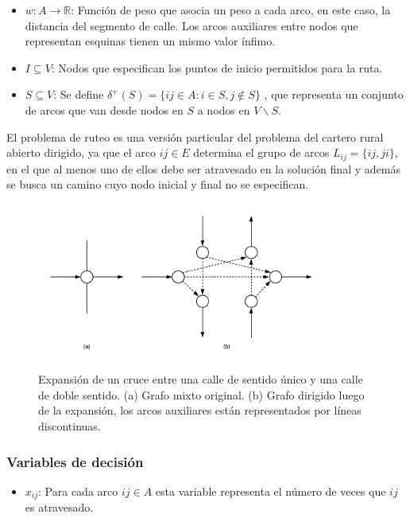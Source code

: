 \documentclass[spanish, conference]{IEEEtran}
\begin{document}
{\begin{itemize}
\item $w : A \rightarrow \mathbb{R} $: Función de peso que asocia un peso a cada arco, en este caso, la distancia del segmento de calle. Los arcos auxiliares entre nodos que representan esquinas tienen un mismo valor ínfimo.

\item $I \subseteq V $: Nodos que especifican los puntos de inicio permitidos para la ruta.

\item $S \subseteq V$: Se define $\delta^+ (S) = \{i j \in A: i \in S , j \notin S \}$ , que representa un conjunto de arcos que van desde nodos en $S$ a nodos en $V \backslash S$.
\end{itemize}

El problema de ruteo es una versión particular del problema del cartero rural abierto dirigido, ya que el arco $i j \in E $ determina el grupo de arcos $L_{i j} = \{i j, j i\}$, en el que al menos uno de ellos debe ser atravesado en la solución final y además se busca un camino cuyo nodo inicial y final no se especifican.

\begin{figure}[htbp]
\centerline{\includegraphics[width=9.5cm]{imagenes/expanded_graph.png}}
\caption{Expansión de un cruce entre una calle de sentido único y una calle de doble sentido. (a) Grafo mixto original. (b) Grafo dirigido luego de la expansión, los arcos auxiliares están representados por líneas discontinuas. \cite{Braier2017AnArgentina}}
\label{fig:grafo_expandido}
\end{figure}

\subsubsection{Variables de decisión}
\begin{itemize}
\item $x_{i j}$: Para cada arco $ {i j} \in A$ esta variable representa el número de veces que $i j$ es atravesado.


\end{itemize}}
\end{document}

